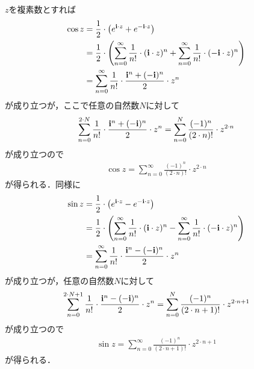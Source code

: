 	\begin{sketch}
		$z$を複素数とすれば
		\begin{align}
			\cos{z} &= \frac{1}{2} \cdot \left( e^{\mathbf{i} \cdot z} + e^{-\mathbf{i} \cdot z} \right) \\
			&= \frac{1}{2} \cdot \left( \sum_{n=0}^{\infty} \frac{1}{n!} \cdot (\mathbf{i} \cdot z)^{n}
				+ \sum_{n=0}^{\infty} \frac{1}{n!} \cdot (-\mathbf{i} \cdot z)^{n} \right) \\
			&= \sum_{n=0}^{\infty} \frac{1}{n!} \cdot \frac{\mathbf{i}^{n} + (-\mathbf{i})^{n}}{2} \cdot z^{n}
		\end{align}
		が成り立つが，ここで任意の自然数$N$に対して
		\begin{align}
			\sum_{n=0}^{2 \cdot N} \frac{1}{n!} \cdot \frac{\mathbf{i}^{n} + (-\mathbf{i})^{n}}{2} \cdot z^{n}
			= \sum_{n=0}^{N} \frac{(-1)^{n}}{(2 \cdot n)!} \cdot z^{2 \cdot n}
		\end{align}
		が成り立つので
		\begin{align}
			\cos{z} = \sum_{n=0}^{\infty} \frac{(-1)^{n}}{(2 \cdot n)!} \cdot z^{2 \cdot n}
		\end{align}
		が得られる．同様に
		\begin{align}
			\sin{z} &= \frac{1}{2} \cdot \left( e^{\mathbf{i} \cdot z} - e^{-\mathbf{i} \cdot z} \right) \\
			&= \frac{1}{2} \cdot \left( \sum_{n=0}^{\infty} \frac{1}{n!} \cdot (\mathbf{i} \cdot z)^{n}
				- \sum_{n=0}^{\infty} \frac{1}{n!} \cdot (-\mathbf{i} \cdot z)^{n} \right) \\
			&= \sum_{n=0}^{\infty} \frac{1}{n!} \cdot \frac{\mathbf{i}^{n} - (-\mathbf{i})^{n}}{2} \cdot z^{n}
		\end{align}
		が成り立つが，任意の自然数$N$に対して
		\begin{align}
			\sum_{n=0}^{2 \cdot N + 1} \frac{1}{n!} \cdot \frac{\mathbf{i}^{n} - (-\mathbf{i})^{n}}{2} \cdot z^{n}
			= \sum_{n=0}^{N} \frac{(-1)^{n}}{(2 \cdot n + 1)!} \cdot z^{2 \cdot n + 1}
		\end{align}
		が成り立つので
		\begin{align}
			\sin{z} = \sum_{n=0}^{\infty} \frac{(-1)^{n}}{(2 \cdot n + 1)!} \cdot z^{2 \cdot n + 1}
		\end{align}
		が得られる．
		\QED
	\end{sketch}
	
